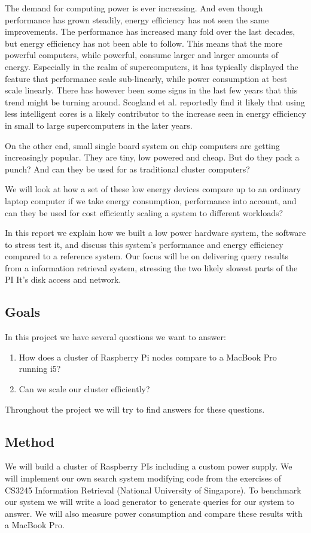 The demand for computing power is ever increasing. And even though performance has grown steadily, energy efficiency has not seen the same improvements.
The performance has increased many fold over the last decades, but energy efficiency has not been able to follow. This means that the more powerful computers, while powerful, consume larger and larger amounts of energy.
Especially in the realm of supercomputers, it has typically displayed the feature that performance scale sub-linearly, while power consumption at best scale linearly.
There has however been some signs in the last few years that this trend might be turning around\cite{green500}.
Scogland et al.\cite{green500} reportedly find it likely that using less intelligent cores is a likely contributor to the increase seen in energy efficiency in small to large supercomputers in the later years.

On the other end, small single board system on chip computers are getting increasingly popular. They are tiny, low powered and cheap. But do they pack a punch? And can they be used for as traditional cluster computers?

We will look at how a set of these low energy devices compare up to an ordinary laptop computer if we take energy consumption, performance into account, and can they be used for cost efficiently scaling a system to different workloads?

In this report we explain how we built a low power hardware system, the software to stress test it, and discuss this system's performance and energy efficiency compared to a reference system. Our focus will be on delivering query results from a information retrieval system, stressing the two likely slowest parts of the PI\:
It's disk access and network.

\subsection{Goals}
In this project we have several questions we want to answer:
\begin{enumerate}
\item How does a cluster of Raspberry Pi nodes compare to a MacBook Pro running i5?
\item Can we scale our cluster efficiently?
\end{enumerate}

Throughout the project we will try to find answers for these questions.

\subsection{Method}
We will build a cluster of Raspberry PIs including a custom power supply. We will implement our own search system modifying code from the exercises of CS3245 Information Retrieval (National University of Singapore). To benchmark our system we will write a load generator to generate queries for our system to answer. We will also measure power consumption and compare these results with a MacBook Pro.


